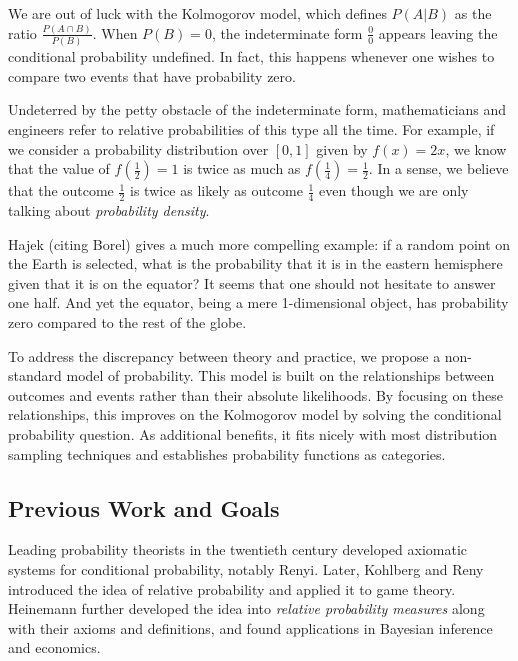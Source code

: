 \documentclass[twoside]{article}
\theoremstyle{plain}%
\theoremstyle{definition}
\theoremstyle{remark}
\begin{document}
We are out of luck with the Kolmogorov model, which defines \(P(A|B)\) as the ratio \(\frac{P(A \cap B)}{P(B)}\). When \(P(B) = 0\), the indeterminate form \(\frac{0}{0}\) appears leaving the conditional probability undefined. In fact, this happens whenever one wishes to compare two events that have probability zero.

Undeterred by the petty obstacle of the indeterminate form, mathematicians and engineers refer to relative probabilities of this type all the time. For example, if we consider a probability distribution over \([0, 1]\) given by \(f(x) = 2x\), we know that the value of \(f(\frac{1}{2}) = 1\) is twice as much as \(f(\frac{1}{4}) = \frac{1}{2}\). In a sense, we believe that the outcome \(\frac{1}{2}\)  is twice as likely as outcome \(\frac{1}{4}\) even though we are only talking about \textit{probability density}.

Hajek\cite{hajek} (citing Borel) gives a much more compelling example: if a random point on the Earth is selected, what is the probability that it is in the eastern hemisphere given that it is on the equator? It seems that one should not hesitate to answer one half. And yet the equator, being a mere 1-dimensional object, has probability zero compared to the rest of the globe.

To address the discrepancy between theory and practice, we propose a non-standard model of probability. This model is built on the relationships between outcomes and events rather than their absolute likelihoods. By focusing on these relationships, this improves on the Kolmogorov model by solving the conditional probability question. As additional benefits, it fits nicely with most distribution sampling techniques and establishes probability functions as categories.

\subsection{Previous Work and Goals}

Leading probability theorists in the twentieth century developed axiomatic systems for conditional probability, notably Renyi\cite{renyi}. Later, Kohlberg and Reny\cite{kohlberg} introduced the idea of relative probability and applied it to game theory. Heinemann\cite{heinemann} further developed the idea into \textit{relative probability measures} along with their axioms and definitions, and found applications in Bayesian inference and economics\cite{heinemann_econ}.
\end{document}
